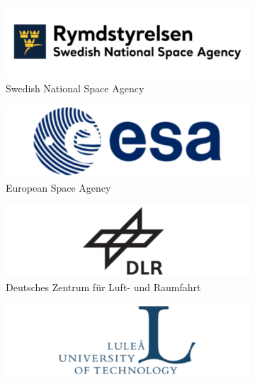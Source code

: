  \begin{figure}[htbp]
 	\centering
 	\begin{subfigure}{0.3\textwidth}
 		\includegraphics[width=1\linewidth]{0-cover/img/snsa.png}
 		\caption*{Swedish National Space Agency}
 	\end{subfigure}
 	\begin{subfigure}{0.3\textwidth}
 		\includegraphics[width=1\linewidth]{0-cover/img/esa.png}
 		\caption*{European Space Agency}
 	\end{subfigure}
 	\begin{subfigure}{0.3\textwidth}
 		\includegraphics[width=1\linewidth]{0-cover/img/dlr.png}
 		\caption*{Deutsches Zentrum für Luft- und Raumfahrt}
 	\end{subfigure}
 	\begin{subfigure}{0.3\textwidth}
 		\includegraphics[width=1\linewidth]{0-cover/img/ltu.png}

\end{subfigure}
\end{figure}
